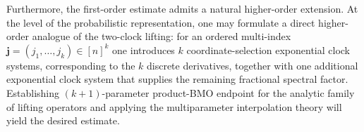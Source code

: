 \documentclass{amsart}
\numberwithin{equation}{section}
\theoremstyle{definition}
\theoremstyle{remark}
\newcommand{\1}{\mathbf 1}
\begin{document}


Furthermore, the first-order estimate admits a natural higher-order extension.  At the level of the probabilistic representation, one may formulate a direct higher-order analogue of the two-clock lifting: for an ordered multi-index $\mathbf j=(j_{1},\ldots,j_{k})\in[n]^{k}$ one introduces $k$ coordinate-selection exponential clock systems, corresponding to the $k$ discrete derivatives, together with one
additional exponential clock system that supplies the remaining
fractional spectral factor. Establishing $(k+1)$-parameter product-BMO endpoint for the analytic family of lifting operators and applying the multiparameter interpolation theory will yield the desired estimate.
\end{document}
